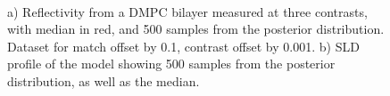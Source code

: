 \documentclass[12pt]{article}
\begin{document}
\begin{figure}%
\centering
{}\hspace{1em}%
\\%
\caption{a) Reflectivity from a DMPC bilayer measured at three contrasts, with median in red, and 500 samples from the posterior distribution. Dataset for  match offset by 0.1,  contrast offset by 0.001. b) SLD profile of the  model showing 500 samples from the posterior distribution, as well as the median.}
\end{figure}
\end{document}
